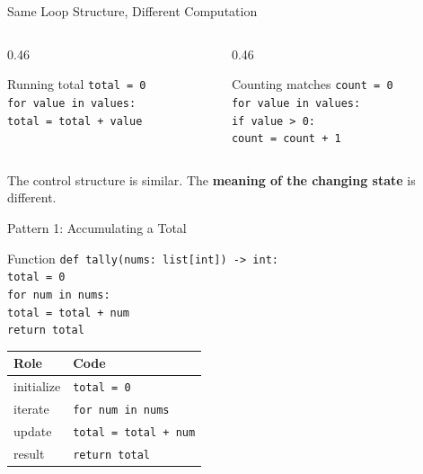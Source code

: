 \documentclass[aspectratio=169,10pt]{beamer}
\begin{document}
\begin{frame}{Same Loop Structure, Different Computation}
  \begin{columns}[T,onlytextwidth]
    \begin{column}{0.46\textwidth}
      \begin{block}{Running total}
        \texttt{total = 0}\\
        \texttt{for value in values:}\\
        \hspace{0.18in}\texttt{total = total + value}
      \end{block}
    \end{column}
    \begin{column}{0.46\textwidth}
      \begin{block}{Counting matches}
        \texttt{count = 0}\\
        \texttt{for value in values:}\\
        \hspace{0.18in}\texttt{if value > 0:}\\
        \hspace{0.36in}\texttt{count = count + 1}
      \end{block}
    \end{column}
  \end{columns}

  The control structure is similar. The \textbf{meaning of the changing state} is different.
\end{frame}




\begin{frame}{Pattern 1: Accumulating a Total}
  \begin{block}{Function}
    \texttt{def tally(nums: list[int]) -> int:}\\
    \hspace{0.20in}\texttt{total = 0}\\
    \hspace{0.20in}\texttt{for num in nums:}\\
    \hspace{0.40in}\texttt{total = total + num}\\
    \hspace{0.20in}\texttt{return total}
  \end{block}

  \begin{center}
    \renewcommand{\arraystretch}{1.25}
    \begin{tabular}{l|l}
      \textbf{Role} & \textbf{Code} \\\hline
      initialize & \texttt{total = 0} \\
      iterate & \texttt{for num in nums} \\
      update & \texttt{total = total + num} \\
      result & \texttt{return total}
    \end{tabular}
  \end{center}
\end{frame}
\end{document}
